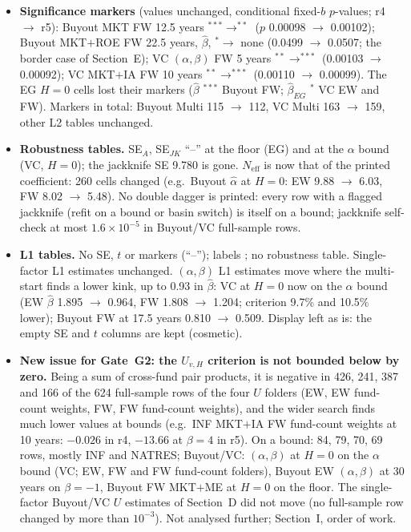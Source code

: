 \documentclass[11pt]{article}
\newcommand{\code}[1]{\texttt{\detokenize{#1}}}
\begin{document}
\begin{itemize}
\item \textbf{Significance markers} (values unchanged, conditional fixed-$b$ $p$-values; r4 $\to$ r5): Buyout MKT FW 12.5 years $^{***}\to^{**}$ ($p$ 0.00098 $\to$ 0.00102); Buyout MKT$+$ROE FW 22.5 years, $\hat\beta$, $^{*}\to$ none (0.0499 $\to$ 0.0507; the border case of Section~E); VC $(\alpha,\beta)$ FW 5 years $^{**}\to^{***}$ (0.00103 $\to$ 0.00092); VC MKT$+$IA FW 10 years $^{**}\to^{***}$ (0.00110 $\to$ 0.00099). The EG $H=0$ cells lost their markers ($\hat\beta$ $^{***}$ Buyout FW; $\hat\beta_{EG}$ $^{*}$ VC EW and FW). Markers in total: Buyout Multi 115 $\to$ 112, VC Multi 163 $\to$ 159, other L2 tables unchanged.
\item \textbf{Robustness tables.} SE$_A$, SE$_{JK}$ ``--'' at the floor (EG) and at the $\alpha$ bound (VC, $H=0$); the jackknife SE 9.780 is gone. $N_{\mathrm{eff}}$ is now that of the printed coefficient: 260 cells changed (e.g.\ Buyout $\hat\alpha$ at $H=0$: EW 9.88 $\to$ 6.03, FW 8.02 $\to$ 5.48). No double dagger is printed: every row with a flagged jackknife (refit on a bound or basin switch) is itself on a bound; jackknife self-check at most $1.6\times10^{-5}$ in Buyout/VC full-sample rows.
\item \textbf{L1 tables.} No SE, $t$ or markers (``--''); labels \code{\_l1}; no robustness table. Single-factor L1 estimates unchanged. $(\alpha,\beta)$ L1 estimates move where the multi-start finds a lower kink, up to 0.93 in $\hat\beta$: VC at $H=0$ now on the $\alpha$ bound (EW $\hat\beta$ 1.895 $\to$ 0.964, FW 1.808 $\to$ 1.204; criterion 9.7\% and 10.5\% lower); Buyout FW at 17.5 years 0.810 $\to$ 0.509. Display left as is: the empty SE and $t$ columns are kept (cosmetic).
\item \textbf{New issue for Gate~G2: the $U_{v,H}$ criterion is not bounded below by zero.} Being a sum of cross-fund pair products, it is negative in 426, 241, 387 and 166 of the 624 full-sample rows of the four $U$ folders (EW, EW fund-count weights, FW, FW fund-count weights), and the wider search finds much lower values at bounds (e.g.\ INF MKT$+$IA FW fund-count weights at 10 years: $-0.026$ in r4, $-13.66$ at $\beta=4$ in r5). On a bound: 84, 79, 70, 69 rows, mostly INF and NATRES; Buyout/VC: $(\alpha,\beta)$ at $H=0$ on the $\alpha$ bound (VC; EW, FW and FW fund-count folders), Buyout EW $(\alpha,\beta)$ at 30 years on $\beta=-1$, Buyout FW MKT$+$ME at $H=0$ on the floor. The single-factor Buyout/VC $U$ estimates of Section~D did not move (no full-sample row changed by more than $10^{-3}$). Not analysed further; Section~I, order of work.

\end{itemize}
\end{document}
